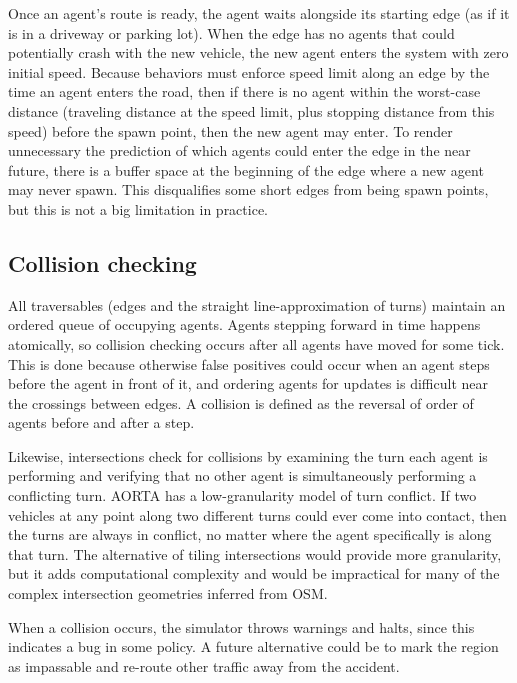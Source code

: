\documentclass[letterpaper, 10 pt, conference]{ieeeconf}  %
\begin{document}
Once an agent's route is ready, the agent waits alongside its starting edge (as
if it is in a driveway or parking lot). When the edge has no agents that could
potentially crash with the new vehicle, the new agent enters the system with
zero initial speed.  Because behaviors must enforce speed limit along an edge by
the time an agent enters the road, then if there is no agent within the
worst-case distance (traveling distance at the speed limit, plus stopping
distance from this speed) before the spawn point, then the new agent may enter.
To render unnecessary the prediction of which agents could enter the edge in the
near future, there is a buffer space at the beginning of the edge where a new
agent may never spawn. This disqualifies some short edges from being spawn
points, but this is not a big limitation in practice.

\subsection{Collision checking}

All traversables (edges and the straight line-approximation of turns) maintain
an ordered queue of occupying agents. Agents stepping forward in time happens
atomically, so collision checking occurs after all agents have moved for some
tick. This is done because otherwise false positives could occur when an agent
steps before the agent in front of it, and ordering agents for updates is
difficult near the crossings between edges.  A collision is
defined as the reversal of order of agents before and after a step.

Likewise, intersections check for collisions by examining the turn each agent is
performing and verifying that no other agent is simultaneously performing a
conflicting turn.  AORTA has a low-granularity model of turn conflict. If two
vehicles at any point along two different turns could ever come into contact,
then the turns are always in conflict, no matter where the agent specifically is
along that turn.  The alternative of tiling intersections \cite{JAIR08-dresner}
would provide more granularity, but it adds computational complexity and would
be impractical for many of the complex intersection geometries inferred from
OSM.

When a collision occurs, the simulator throws warnings and halts, since this
indicates a bug in some policy. A future alternative could be to mark the region
as impassable and re-route other traffic away from the accident.
\end{document}
